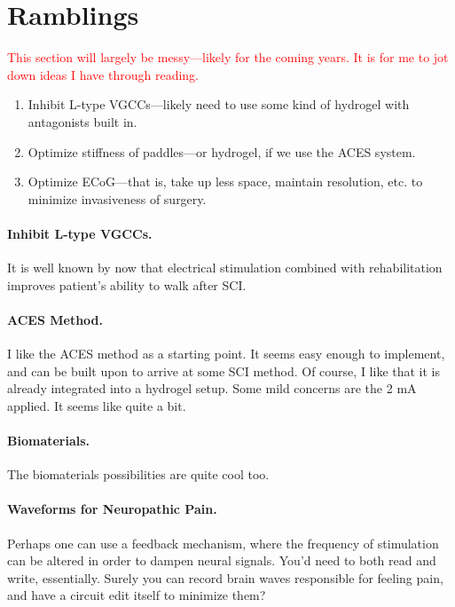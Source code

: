 \documentclass[12pt]{report}
\begin{document}
\chapter{Ramblings}

{\large \textcolor{red}{This section will largely be messy---likely for the coming years. It is for me to jot down ideas I have through reading.}}\newline

\begin{enumerate}
    \item Inhibit L-type VGCCs---likely need to use some kind of hydrogel with antagonists built in. 
    \item Optimize stiffness of paddles---or hydrogel, if we use the ACES system. 
    \item Optimize ECoG---that is, take up less space, maintain resolution, etc. to minimize invasiveness of surgery. 
\end{enumerate}

\subsubsection{Inhibit L-type VGCCs.}
It is well known by now that electrical stimulation combined with rehabilitation improves patient's ability to walk after SCI. 

\subsubsection{ACES Method.}

I like the ACES method as a starting point. It seems easy enough to implement, and can be built upon to arrive at some SCI method. Of course, I like that it is already integrated into a hydrogel setup. Some mild concerns are the 2 mA applied. It seems like quite a bit. 

\subsubsection{Biomaterials.}

The biomaterials possibilities are quite cool too. 

\subsubsection{Waveforms for Neuropathic Pain.}
Perhaps one can use a feedback mechanism, where the frequency of stimulation can be altered in order to dampen neural signals. You'd need to both read and write, essentially. Surely you can record brain waves responsible for feeling pain, and have a circuit edit itself to minimize them?
\end{document}
